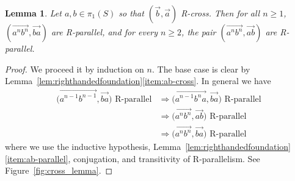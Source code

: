 \documentclass[11pt]{amsart}
\newcommand{\ora}[1]{\overrightarrow{#1}}
\numberwithin{equation}{section}
\numberwithin{figure}{section}
\newtheorem{lemma}[theorem]{Lemma}
\theoremstyle{definition}
\theoremstyle{plain}
\begin{document}
\begin{lemma} 
  Let $a,b \in \pi_1(S)$ so that $(\ora{b},\ora{a})$ R-cross. Then for all
  $n \ge 1$, $(\ora{a^n
  b^n},\ora{ba})$ are R-parallel, and for every $n \geq 2$, the pair $(\ora{a^n
  b^n},\ora{ab})$ are R-parallel.
\label{lem:anbn_vs_bkak_parallel}
\end{lemma}
\begin{proof}
We proceed it by induction on $n$. The base case is clear by
Lemma~\ref{lem:righthandedfoundation}\ref{item:ab-cross}.
In general we have
\begin{align*}
  \bigl(\ora{a^{n-1}b^{n-1}},\ora{ba}\bigr)\text{ R-parallel}
  &\Rightarrow
    \bigl(\ora{a^{n-1}b^n a}, \ora{ba}\bigr)\text{ R-parallel}\\
  &\Rightarrow
    \bigl(\ora{a^nb^n}, \ora{ab}\bigr)\text{ R-parallel}\\
  &\Rightarrow
    \bigl(\ora{a^nb^n}, \ora{ba}\bigr)\text{ R-parallel}
\end{align*}
where we use the inductive hypothesis,
Lemma~\ref{lem:righthandedfoundation}\ref{item:ab-parallel},
conjugation, and transitivity of R\hyp parallelism. See
Figure~\ref{fig:cross_lemma}.
\end{proof}
\end{document}
